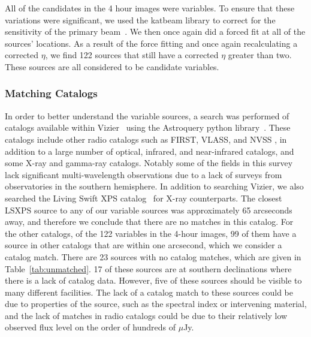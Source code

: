 \documentclass[12pt]{article}
\begin{document}
All of the candidates in the 4 hour images were variables. To ensure that these variations were significant, we used the katbeam library to correct for the sensitivity of the primary beam~\citep{2022AJ....163..135D}. We then once again did a forced fit at all of the sources' locations. As a result of the force fitting and once again recalculating a corrected $\eta$, we find 122 sources that still have a corrected $\eta$ greater than two. These sources are all considered to be candidate variables. 
\subsubsection{Matching Catalogs}
\label{sec:MatchingCatalogs}
In order to better understand the variable sources, a search was performed of catalogs available within Vizier~\citep[]{vizier} using the Astroquery python library~\citep{2019AJ....157...98G}. These catalogs include other radio catalogs such as FIRST, VLASS,  and NVSS \citep{2015ApJ...801...26H,2021ApJS..255...30G,1998AJ....115.1693C}, in addition to a large number of optical, infrared, and near-infrared catalogs, and some X-ray and gamma-ray catalogs. Notably some of the fields in this survey lack significant multi-wavelength observations due to a lack of surveys from observatories in the southern hemisphere. In addition to searching Vizier, we also searched the Living Swift XPS catalog~\citep{2022MNRAS.tmp.2790E} for X-ray counterparts. The closest LSXPS source to any of our variable sources was approximately 65 arcseconds away, and therefore we conclude that there are no matches in this catalog. For the other catalogs, of the 122 variables in the 4-hour images, 99 of them have a source in other catalogs that are within one arcsecond, which we consider a catalog match. There are 23 sources with no catalog matches, which are given in Table~\ref{tab:unmatched}. 17 of these sources are at southern declinations where there is a lack of catalog data. However, five of these sources should be visible to many different facilities. The lack of a catalog match to these sources could be due to properties of the source, such as the spectral index or intervening material, and the lack of matches in radio catalogs could be due to their relatively low observed flux level on the order of hundreds of $\mu$Jy.
\end{document}
